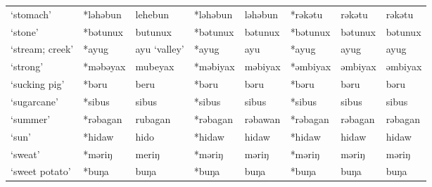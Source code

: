 \begin{landscape}
\begin{longtable}[c]{@{}p{3cm}<{\raggedright}p{2.75cm}<{\raggedright}p{2.75cm}<{\raggedright}p{2.75cm}<{\raggedright}p{2.75cm}<{\raggedright}p{2.75cm}<{\raggedright}p{2.75cm}<{\raggedright}p{2.75cm}<{\raggedright}@{}}
`stomach'                                            & *ləhəbun     & lehebun                       & *ləhəbun       & ləhəbun                    & *rəkətu          & rəkətu                   & rəkətu                            \\
`stone'                                              & *bətunux     & butunux                       & *bətunux       & bətunux                    & *bətunux         & bətunux                  & bətunux                           \\
`stream; creek'                                      & *ayug        & ayu `valley'                  & *ayug          & ayu                        & *ayug            & ayug                     & ayug                              \\
`strong'                                             & *məbəyax     & mubeyax                       & *məbiyax       & məbiyax                    & *əmbiyax         & əmbiyax                  & əmbiyax                           \\
`sucking pig'                                        & *bəru        & beru                          & *bəru          & bəru                       & *bəru            & bəru                     & bəru                              \\
`sugarcane'                                          & *sibus       & sibus                         & *sibus         & sibus                      & *sibus           & sibus                    & sibus                             \\
`summer'                                             & *rəbagan     & rubagan                       & *rəbagan       & rəbawan                    & *rəbagan         & rəbagan                  & rəbagan                           \\
`sun'                                                & *hidaw       & hido                          & *hidaw         & hidaw                      & *hidaw           & hidaw                    & hidaw                             \\
`sweat'                                              & *məriŋ       & meriŋ                         & *məriŋ         & məriŋ                      & *məriŋ           & məriŋ                    & məriŋ                             \\
`sweet potato'                                       & *buŋa        & buŋa                          & *buŋa          & buŋa                       & *buŋa            & buŋa                     & buŋa                              \\

\end{longtable}
\end{landscape}
